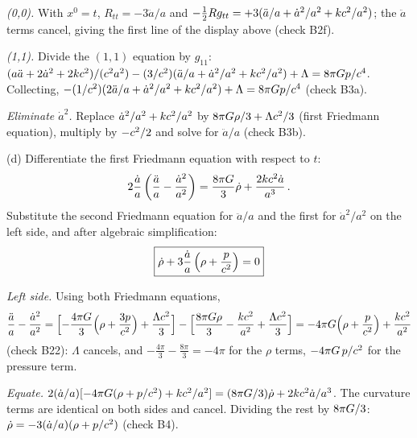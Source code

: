 \begin{derivation}
\textit{(0,0).}  With $x^0 = t$, $R_{tt} = -3\ddot a/a$ and
$-\tfrac12 R g_{tt} = +3(\ddot a/a + \dot a^2/a^2 + kc^2/a^2)$; the
$\ddot a$ terms cancel, giving the first line of the display above (check B2f).

\textit{(1,1).}  Divide the $(1,1)$ equation by $g_{11}$:
$(a\ddot a + 2\dot a^2 + 2kc^2)/(c^2a^2)
- (3/c^2)(\ddot a/a + \dot a^2/a^2 + kc^2/a^2) + \Lambda
= 8\pi G p/c^4$.  Collecting,
$-(1/c^2)(2\ddot a/a + \dot a^2/a^2 + kc^2/a^2) + \Lambda
= 8\pi G p/c^4$ (check B3a).

\textit{Eliminate $\dot a^2$.}  Replace $\dot a^2/a^2 + kc^2/a^2$ by
$8\pi G\rho/3 + \Lambda c^2/3$ (first Friedmann equation), multiply
by $-c^2/2$ and solve for $\ddot a/a$ (check B3b).
\end{derivation}
(d) Differentiate the first Friedmann equation with respect to $t$:
\[
    2\frac{\dot{a}}{a}\left(\frac{\ddot{a}}{a} - \frac{\dot{a}^2}{a^2}\right)
    = \frac{8\pi G}{3}\dot{\rho}
    + \frac{2kc^2\dot{a}}{a^3} \,.
\]
Substitute the second Friedmann equation for $\ddot{a}/a$ and
the first for $\dot{a}^2/a^2$ on the left side, and after
algebraic simplification:
\[
    \boxed{\dot{\rho} + 3\frac{\dot{a}}{a}\left(\rho
    + \frac{p}{c^2}\right) = 0}
\]


\begin{derivation}
\textit{Left side.}  Using both Friedmann equations,
\[
  \frac{\ddot a}{a} - \frac{\dot a^2}{a^2}
  = \Bigl[-\frac{4\pi G}{3}\Bigl(\rho + \frac{3p}{c^2}\Bigr)
     + \frac{\Lambda c^2}{3}\Bigr]
  - \Bigl[\frac{8\pi G\rho}{3} - \frac{kc^2}{a^2}
     + \frac{\Lambda c^2}{3}\Bigr]
  = -4\pi G\Bigl(\rho + \frac{p}{c^2}\Bigr) + \frac{kc^2}{a^2}
\]
(check B22): $\Lambda$ cancels, and $-\tfrac{4\pi}{3} - \tfrac{8\pi}{3} = -4\pi$
for the $\rho$ terms, $-4\pi G\,p/c^2$ for the pressure term.

\textit{Equate.}  $2(\dot a/a)[-4\pi G(\rho + p/c^2)
+ kc^2/a^2] = (8\pi G/3)\dot\rho + 2kc^2\dot a/a^3$.
The curvature terms are identical on both sides and cancel.  Dividing the rest by
$8\pi G/3$:
$\dot\rho = -3(\dot a/a)(\rho + p/c^2)$ (check B4).
\end{derivation}
